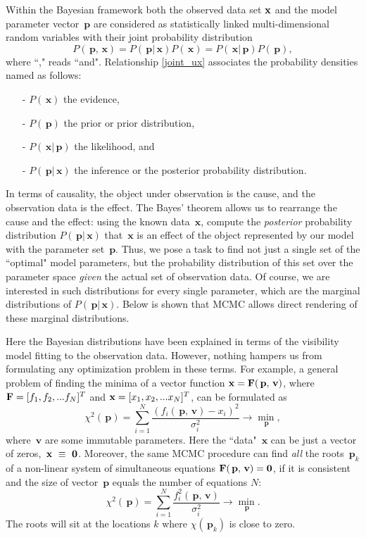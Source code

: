 \documentclass[preprint2]{aastex}
\newcommand{\bfv}{\,\mathbf{v}}
\newcommand{\bp}{\,\mathbf{p}}
\newcommand{\bx}{\,\mathbf{x}}
\begin{document}
Within the Bayesian framework both the observed data set $\bf{x}$ and the model parameter vector $\bp$ are considered as statistically linked multi-dimensional random variables with their joint probability distribution
\begin{equation}
  \label{joint_ux}
  P(\bp,\bx) =  P(\bp|\bx)P(\bx) = P(\bx|\bp)P(\bp),
\end{equation}
where ``," reads ``and". Relationship \eqref{joint_ux} associates the probability densities named as follows:
\begin{itemize}
  \item[-] $P(\bx)$ the evidence,
  \item[-] $P(\bp)$ the prior or prior distribution,
  \item[-] $P(\bx|\bp)$ the likelihood, and
  \item[-] $P(\bp|\bx)$ the inference or the posterior probability distribution.
\end{itemize}
In terms of causality, the object under observation is the cause, and the observation data is the effect. The Bayes' theorem allows us to rearrange the cause and the effect: using the known data $\bx$, compute the \emph{posterior} probability distribution $P(\bp|\bx)$ that $\bx$ is an effect of the object represented by our model with the parameter set $\bp$. Thus, we pose a task to find not just a single set of the ``optimal" model parameters, but the probability distribution of this set over the parameter space \emph{given} the actual set of observation data. Of course, we are interested in such distributions for every single parameter, which are the marginal distributions of $P(\bp|\bx)$. Below is shown that MCMC allows direct rendering of these marginal distributions. 

Here the Bayesian distributions have been explained in terms of the visibility model fitting to the observation data. However, nothing hampers us from formulating any optimization problem in these terms. For example, a general problem of finding the minima of a vector function ${\bf x} = {\bf F}(\bp,\bfv)$, where ${\bf F} = [f_1, f_2, ... f_N]^T$ and ${\bf x} = [x_1, x_2, ... x_N]^T$, can be formulated as
\begin{equation}
  \label{vector_optimization_problem}
  \chi^2(\bp) = \sum_{i=1}^{N} \frac{(f_i(\bp,\bfv) - x_i)^2}{\sigma_i^2}  \rightarrow {\min\limits_{\bp}},
\end{equation}
where $\bfv$ are some immutable parameters. Here the ``data" $\bx$ can be just a vector of zeros, $\bx~\equiv~{\bf 0}$. Moreover, the same MCMC procedure can find \emph{all} the roots $\bp_k$ of a non-linear system of simultaneous equations ${\bf F}(\bp,\bfv) = {\bf 0}$, if it is consistent and the size of vector $\bp$ equals the number of equations $N$:
\begin{equation}
  \label{vector_optimization_problem}
  \chi^2(\bp) = \sum_{i=1}^{N} \frac{f_i^2(\bp,\bfv)}{\sigma_i^2}  \rightarrow {\min\limits_{\bp}}.
\end{equation}
The roots will sit at the locations $k$ where $\chi(\bp_k)$ is close to zero.
\end{document}
